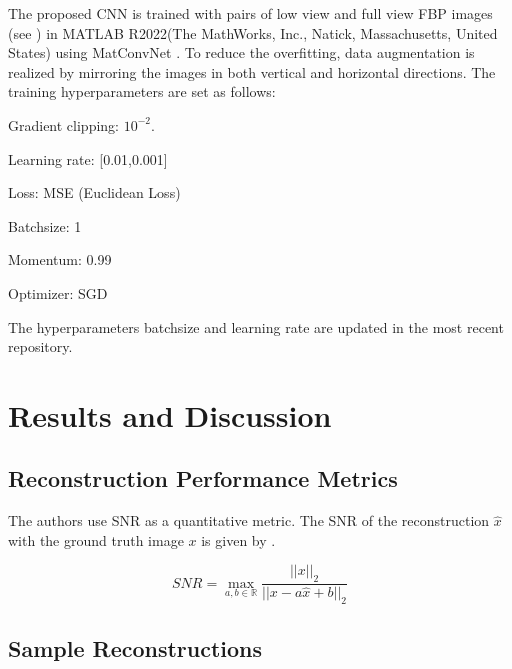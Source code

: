 \documentclass[journal, onecolumn, 11pt]{IEEEtran}
\begin{document}
The proposed CNN is trained with pairs of low view and full view FBP images (see ) in MATLAB R2022(The MathWorks, Inc., Natick, Massachusetts, United States) using MatConvNet \cite{vedaldi2015matconvnet}. To reduce the overfitting, data augmentation is realized by mirroring the images in both vertical and horizontal directions. The training hyperparameters are set as follows: 

\begin{itemize}
\begin{multicols}{3}
    \item Gradient clipping: $10^{-2}$.
    \item Learning rate: [0.01,0.001]
    \item Loss: MSE (Euclidean Loss)
    \item Batchsize: 1
    \item Momentum: 0.99
    \item Optimizer: SGD
    \end{multicols}
\end{itemize}

The hyperparameters batchsize and learning rate are updated in the most recent repository.

\section{Results and Discussion}

\subsection{Reconstruction Performance Metrics}
The authors use SNR as a quantitative metric. The SNR of the reconstruction $\hat{x}$ with the ground truth image $x$ is given by .

\begin{equation}
    SNR = \operatorname*{max}_{a,b \in \mathbb{R}} \frac{||x||_2}{||x - a\hat{x} + b||_2}
    \label{eqn:SNR}
\end{equation}

\subsection{Sample Reconstructions}

\end{document}
